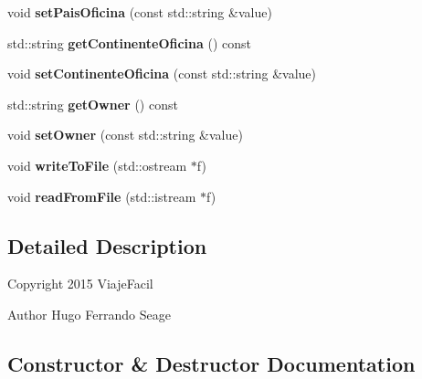 \begin{DoxyCompactItemize}
\item 
\hypertarget{classentradaHistorial_a7ba50bae0da3388440153d3c8b35863e}{}void {\bfseries set\+Pais\+Oficina} (const std\+::string \&value)\label{classentradaHistorial_a7ba50bae0da3388440153d3c8b35863e}

\item 
\hypertarget{classentradaHistorial_a636f820854ec922bd6fd22e38e5acb84}{}std\+::string {\bfseries get\+Continente\+Oficina} () const \label{classentradaHistorial_a636f820854ec922bd6fd22e38e5acb84}

\item 
\hypertarget{classentradaHistorial_affde03b37e865a5e086c6191b801a1b8}{}void {\bfseries set\+Continente\+Oficina} (const std\+::string \&value)\label{classentradaHistorial_affde03b37e865a5e086c6191b801a1b8}

\item 
\hypertarget{classentradaHistorial_a81bccc82b3b3295ed258eb3923bca2cc}{}std\+::string {\bfseries get\+Owner} () const \label{classentradaHistorial_a81bccc82b3b3295ed258eb3923bca2cc}

\item 
\hypertarget{classentradaHistorial_a876a1124e1ed5294f1bd20be50f54b4d}{}void {\bfseries set\+Owner} (const std\+::string \&value)\label{classentradaHistorial_a876a1124e1ed5294f1bd20be50f54b4d}

\item 
\hypertarget{classentradaHistorial_ac9fc4494b7a4519610262d6bf2cd88f2}{}void {\bfseries write\+To\+File} (std\+::ostream $\ast$f)\label{classentradaHistorial_ac9fc4494b7a4519610262d6bf2cd88f2}

\item 
\hypertarget{classentradaHistorial_aed867e8d09303d9675548a802d24bd07}{}void {\bfseries read\+From\+File} (std\+::istream $\ast$f)\label{classentradaHistorial_aed867e8d09303d9675548a802d24bd07}

\end{DoxyCompactItemize}


\subsection{Detailed Description}
Copyright 2015 Viaje\+Facil \begin{DoxyAuthor}{Author}
Hugo Ferrando Seage 
\end{DoxyAuthor}


\subsection{Constructor \& Destructor Documentation}
\hypertarget{classentradaHistorial_a899faea9865c1a89fe24306ce634c646}{}
